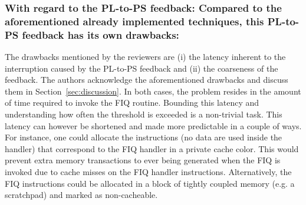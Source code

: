 
        \subsubsection{With regard to the PL-to-PS feedback: Compared
        to the aforementioned already implemented techniques, this
        PL-to-PS feedback has its own drawbacks:}

        The drawbacks mentioned by the reviewers are (i) the latency
        inherent to the interruption caused by the PL-to-PS feedback
        and (ii) the coarseness of the feedback.  The authors
        acknowledge the aforementioned drawbacks and discuss them in
        Section~\ref{sec:discussion}. In both cases, the problem
        resides in the amount of time required to invoke the FIQ
        routine. Bounding this latency and understanding how often the
        threshold is exceeded is a non-trivial task. This latency can
        however be shortened and made more predictable in a couple of
        ways. For instance, one could allocate the instructions (no
        data are used inside the handler) that correspond to the FIQ
        handler in a private cache color. This would prevent extra
        memory transactions to ever being generated when the FIQ is
        invoked due to cache misses on the FIQ handler
        instructions. Alternatively, the FIQ instructions could be
        allocated in a block of tightly coupled memory (e.g. a
        scratchpad) and marked as non-cacheable.

